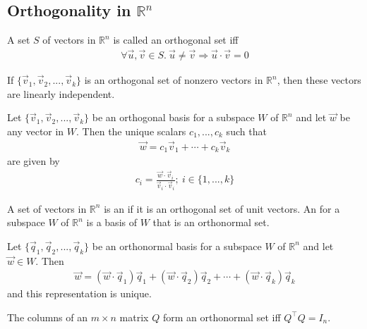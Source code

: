 \documentclass{article}
\begin{document}
\subsection{Orthogonality in $\mathbb{R}^n$}
\begin{definition}
    A set $S$ of vectors in $\mathbb{R}^n$ is called an orthogonal set iff
    \begin{align*}
        \forall \vec u, \vec v\in S.\: \vec u \not= \vec v \Rightarrow \vec u \cdot \vec v = 0
    \end{align*}
\end{definition}
\begin{theorem}
    If $\{\vec v_1, \vec v_2, ...,\vec v_k\}$ is an orthogonal set of nonzero vectors in $\mathbb{R}^n$, then these vectors are linearly independent.
\end{theorem}
\begin{theorem}
    Let $\{\vec v_1, \vec v_2, ..., \vec v_k\}$ be an orthogonal basis for a subspace $W$ of $\mathbb{R}^n$ and let $\vec w$ be any vector in $W$. Then the unique scalars $c_1, ..., c_k$ such that
    \begin{align*}
        \vec w = c_1\vec v_1 + \cdots + c_k\vec v_k
    \end{align*}
    are given by
    \begin{align*}
        c_i = \frac{\vec w \cdot \vec v_i}{\vec v_i \cdot \vec v_i}; \: i \in \{1, ..., k\}
    \end{align*}
\end{theorem}
\begin{definition}
    A set of vectors in $\mathbb{R}^n$ is an  if it is an orthogonal set of unit vectors. An  for a subspace $W$ of $\mathbb{R}^n$ is a basis of $W$ that is an orthonormal set. 
\end{definition}
\begin{theorem}
    Let $\{\vec q_1, \vec q_2, ..., \vec q_k\}$ be an orthonormal basis for a subspace $W$ of $\mathbb{R}^n$ and let $\vec w\in W$. Then
    \begin{align*}
        \vec w = (\vec w \cdot \vec q_1)\vec q_1 + (\vec w\cdot\vec q_2)\vec q_2 + \cdots + (\vec w\cdot\vec q_k)\vec q_k
    \end{align*}
    and this representation is unique.
\end{theorem}
\begin{theorem}
    The columns of an $m\times n$ matrix $Q$ form an orthonormal set iff $Q^\intercal Q=I_n$.
\end{theorem}
\end{document}
